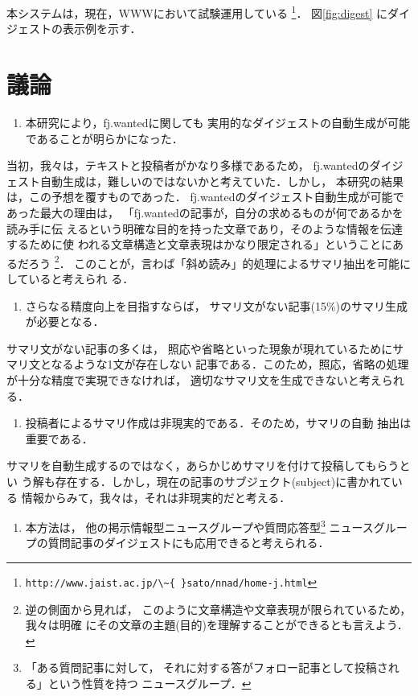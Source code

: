 本システムは，現在，WWWにおいて試験運用している
\footnote{\verb+http://www.jaist.ac.jp/\~{ }sato/nnad/home-j.html+}．
図\ref{fig:digest} にダイジェストの表示例を示す．



\section{議論}

\begin{enumerate}
\item[(1)] 本研究により，fj.wantedに関しても
実用的なダイジェストの自動生成が可能であることが明らかになった．
\end{enumerate}

当初，我々は，テキストと投稿者がかなり多様であるため，
fj.wantedのダイジェスト自動生成は，難しいのではないかと考えていた．しかし，
本研究の結果は，この予想を覆すものであった．
fj.wantedのダイジェスト自動生成が可能であった最大の理由は，
「fj.wantedの記事が，自分の求めるものが何であるかを読み手に伝
えるという明確な目的を持った文章であり，そのような情報を伝達するために使
われる文章構造と文章表現はかなり限定される」ということにあるだろう
\footnote{
逆の側面から見れば，
このように文章構造や文章表現が限られているため，我々は明確
にその文章の主題(目的)を理解することができるとも言えよう．}．
このことが，言わば「斜め読み」的処理によるサマリ抽出を可能にしていると考えられ
る．

\begin{enumerate}
\item[(2)] さらなる精度向上を目指すならば，
サマリ文がない記事(15\%)のサマリ生成が必要となる．
\end{enumerate}

サマリ文がない記事の多くは，
照応や省略といった現象が現れているためにサマリ文となるような1文が存在しない
記事である．このため，照応，省略の処理が十分な精度で実現できなければ，
適切なサマリ文を生成できないと考えられる．

\begin{enumerate}
\item[(3)] 投稿者によるサマリ作成は非現実的である．そのため，サマリの自動
抽出は重要である．
\end{enumerate}

サマリを自動生成するのではなく，あらかじめサマリを付けて投稿してもらうとい
う解も存在する．しかし，現在の記事のサブジェクト(subject)に書かれている
情報からみて，我々は，それは非現実的だと考える．


\begin{enumerate}
\item[(4)] 本方法は，
他の掲示情報型ニュースグループや質問応答型\footnote{「ある質問記事に対して，
それに対する答がフォロー記事として投稿される」という性質を持つ
ニュースグループ．}
ニュースグループの質問記事のダイジェストにも応用できると考えられる．
\end{enumerate}

